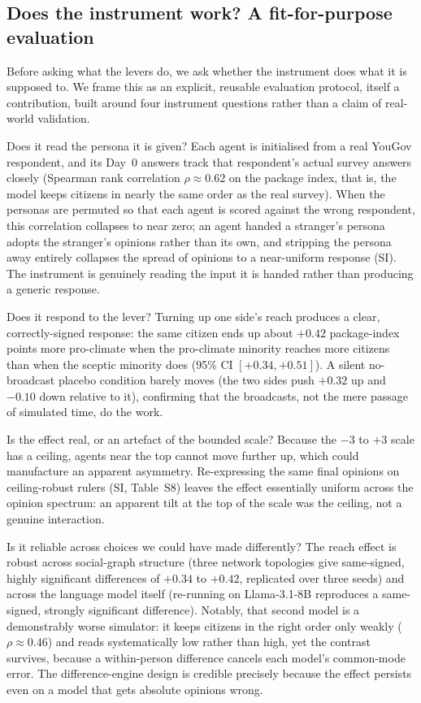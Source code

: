 \documentclass[pdflatex,sn-mathphys-num]{sn-jnl}%
\theoremstyle{thmstyleone}%
\theoremstyle{thmstyletwo}%
\theoremstyle{thmstylethree}%
\begin{document}
\subsection{Does the instrument work? A fit-for-purpose evaluation}\label{subsec:eval}

Before asking what the levers do, we ask whether the instrument does what it is supposed
to. We frame this as an explicit, reusable evaluation protocol, itself a contribution,
built around four instrument questions rather than a claim of real-world validation.

Does it read the persona it is given? Each agent is initialised from a real
YouGov respondent, and its Day~0 answers track that respondent's actual survey answers
closely (Spearman rank correlation $\rho \approx 0.62$ on the package index, that is,
the model keeps citizens in nearly the same order as the real survey). When the personas
are permuted so that each agent is scored against the wrong respondent, this correlation
collapses to near zero; an agent handed a stranger's persona adopts the stranger's
opinions rather than its own, and stripping the persona away entirely collapses the
spread of opinions to a near-uniform response (SI). The instrument is genuinely reading
the input it is handed rather than producing a generic response.

Does it respond to the lever? Turning up one side's reach produces a clear,
correctly-signed response: the same citizen ends up about $+0.42$ package-index points
more pro-climate when the pro-climate minority reaches more citizens than when the
sceptic minority does (95\% CI $[+0.34, +0.51]$). A silent no-broadcast placebo
condition barely moves (the two sides push $+0.32$ up and $-0.10$ down relative to it),
confirming that the broadcasts, not the mere passage of simulated time, do the work.

Is the effect real, or an artefact of the bounded scale? Because the $-3$ to $+3$
scale has a ceiling, agents near the top cannot move further up, which could manufacture
an apparent asymmetry. Re-expressing the same final opinions on ceiling-robust rulers
(SI, Table~S8) leaves the effect essentially uniform across the opinion spectrum: an
apparent tilt at the top of the scale was the ceiling, not a genuine interaction.

Is it reliable across choices we could have made differently? The reach effect is
robust across social-graph structure (three network topologies give same-signed, highly
significant differences of $+0.34$ to $+0.42$, replicated over three seeds) and across
the language model itself (re-running on Llama-3.1-8B reproduces a same-signed, strongly
significant difference). Notably, that second model is a demonstrably worse
simulator: it keeps citizens in the right order only weakly ($\rho \approx 0.46$) and
reads systematically low rather than high, yet the contrast survives, because a
within-person difference cancels each model's common-mode error. The difference-engine
design is credible precisely because the effect persists even on a model that gets
absolute opinions wrong.
\end{document}
